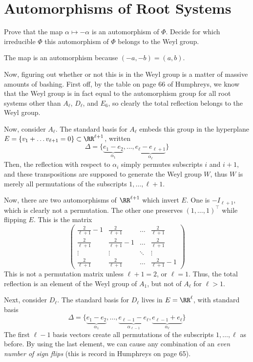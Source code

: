 \documentclass[11pt, headheight=30pt]{scrartcl}
\begin{document}
\section{Automorphisms of Root Systems}
\begin{prob}
    Prove that the map $\alpha \mapsto -\alpha$ is an automorphism of $\Phi$.
    Decide for which irreducible $\Phi$ this automorphism of $\Phi$ belongs to the Weyl group.
\end{prob}

The map is an automorphism because $(-a,-b) = (a,b)$.

Now, figuring out whether or not this is in the Weyl group is a matter of massive amounts
of bashing. First off, by the table on page 66 of Humphreys, we know that
the Weyl group is in fact equal to the automorphism group for
all root systems other than $A_\ell$, $D_\ell$, and $E_6$, so clearly
the total reflection belongs to the Weyl group.

Now, consider $A_\ell$. The standard basis for $A_\ell$ embeds
this group in the hyperplane $E = \{v_1 + \dots v_{\ell + 1} = 0\}\subset \RR^{\ell+1}$,
written
\[
    \Delta = \{\underbrace{e_1 - e_2}_{\alpha_1}, \dots, \underbrace{e_\ell - e_{\ell+1}}_{\alpha_\ell}\}
\]
Then, the reflection with respect to $\alpha_i$ simply permutes
subscripts $i$ and $i + 1$, and these transpositions are supposed
to generate the Weyl group $W$, thus $W$ is merely all permutations
of the subscripts $1, \dots, \ell + 1$.

Now, there are two automorphisms of $\RR^{\ell + 1}$ which invert $E$.
One is $-I_{\ell + 1}$, which is clearly not a permutation.
The other one preserves $(1,\dots,1)^\top$ while flipping $E$.
This is the matrix
\[
    \begin{pmatrix}
        \frac{2}{\ell + 1} - 1 & \frac{2}{\ell + 1} & \dots & \frac{2}{\ell + 1}\\
        \frac{2}{\ell + 1} & \frac{2}{\ell + 1} - 1 & \dots & \frac{2}{\ell + 1}\\
        \vdots & \vdots & \ddots & \vdots\\
        \frac{2}{\ell + 1} & \frac{2}{\ell + 1} & \dots & \frac{2}{\ell + 1} - 1
    \end{pmatrix}
\]
This is not a permutation matrix unless $\ell + 1 = 2$, or $\ell = 1$.
Thus, the total reflection is an element of the Weyl group of $A_1$,
but not of $A_\ell$ for $\ell > 1$.

Next, consider $D_\ell$. The standard basis for $D_\ell$ lives in $E = \RR^\ell$,
with standard basis
\[
    \Delta = \{\underbrace{e_1 - e_2}_{\alpha_1}, \dots, \underbrace{e_{\ell - 1} - e_\ell}_{\alpha_{\ell - 1}}, \underbrace{e_{\ell - 1} + e_\ell}_{\alpha_\ell}\}    
\]
The first $\ell - 1$ basis vectors create all permutations of the subscripts
$1, \dots, \ell$ as before. By using the last element, we can cause any combination
of an \emph{even number of sign flips} (this is record in Humphreys on page 65).
\end{document}
